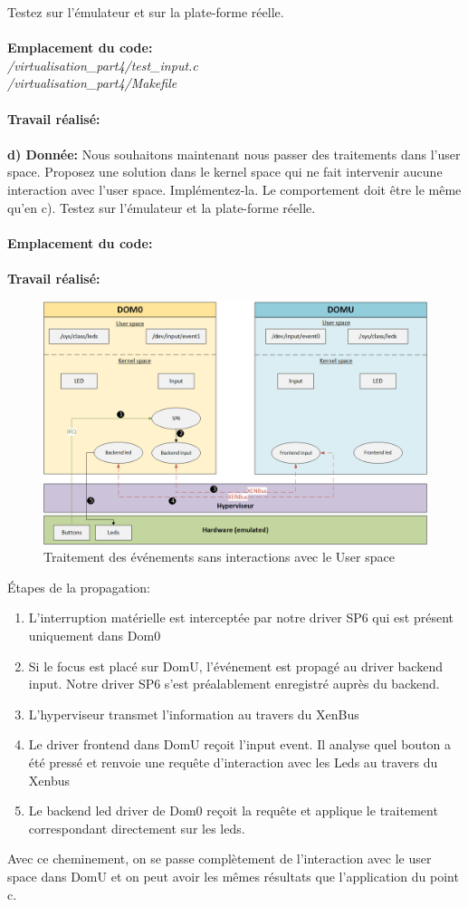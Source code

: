 Testez sur l’émulateur et sur la plate-forme réelle.\\\\
\textbf{Emplacement du code:}\\\textit{/virtualisation\_part4/test\_input.c}\\
\textit{/virtualisation\_part4/Makefile}\\\\
\textbf{Travail réalisé: }\\\\
\textbf{d) Donnée: }Nous souhaitons maintenant nous passer des traitements dans l’user space. Proposez une solution
dans le kernel space qui ne fait intervenir aucune interaction avec l’user space. Implémentez-la.
Le comportement doit être le même qu’en c). Testez sur l’émulateur et la plate-forme réelle.\\\\
\textbf{Emplacement du code: }\\\\
\textbf{Travail réalisé: }
\begin{figure}[H]
	\begin{center}
		\includegraphics[width=17cm]{img/virt5.png}
		\caption{Traitement des événements sans interactions avec le User space}
		\label{virt5}
	\end{center}
\end{figure}
Étapes de la propagation:
\begin{enumerate}
	\item L'interruption matérielle est interceptée par notre driver SP6 qui est présent uniquement dans Dom0
	\item Si le focus est placé sur DomU, l'événement est propagé au driver backend input. Notre driver SP6 s'est préalablement enregistré auprès du backend.
	\item L'hyperviseur transmet l'information au travers du XenBus
	\item Le driver frontend dans DomU reçoit l'input event. Il analyse quel bouton a été pressé et renvoie une requête d'interaction avec les Leds au travers du Xenbus
	\item Le backend led driver de Dom0 reçoit la requête et applique le traitement correspondant directement sur les leds.
\end{enumerate}
Avec ce cheminement, on se passe complètement de l'interaction avec le user space dans DomU et on peut avoir les mêmes résultats que l'application du point c.
